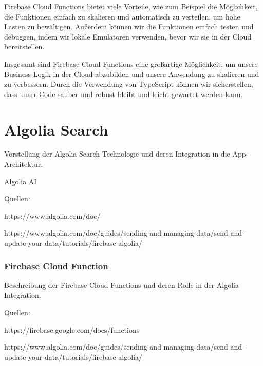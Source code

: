 Firebase Cloud Functions bietet viele Vorteile, wie zum Beispiel die Möglichkeit, die Funktionen einfach zu skalieren und automatisch zu verteilen, um hohe Lasten zu bewältigen. Außerdem können wir die Funktionen einfach testen und debuggen, indem wir lokale Emulatoren verwenden, bevor wir sie in der Cloud bereitstellen.

Insgesamt sind Firebase Cloud Functions eine großartige Möglichkeit, um unsere Business-Logik in der Cloud abzubilden und unsere Anwendung zu skalieren und zu verbessern. Durch die Verwendung von TypeScript können wir sicherstellen, dass unser Code sauber und robust bleibt und leicht gewartet werden kann.

\section{Algolia Search}

Vorstellung der Algolia Search Technologie und deren
Integration in die App-Architektur.

Algolia AI

Quellen:

https://www.algolia.com/doc/

https://www.algolia.com/doc/guides/sending-and-managing-data/send-and-update-your-data/tutorials/firebase-algolia/

\subsubsection{Firebase Cloud Function}

Beschreibung der Firebase Cloud Functions und deren Rolle in der Algolia Integration.

Quellen:

https://firebase.google.com/docs/functions

https://www.algolia.com/doc/guides/sending-and-managing-data/send-and-update-your-data/tutorials/firebase-algolia/
